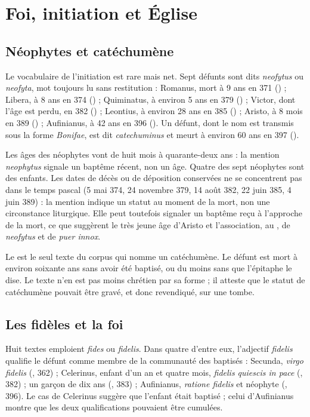 \chapter{Foi, initiation et Église}\label{ch:foi_eglise}

\section{Néophytes et catéchumène}

Le vocabulaire de l’initiation est rare mais net. Sept défunts sont dits \emph{neofytus} ou \emph{neofyta}, mot toujours lu sans restitution : Romanus, mort à 9 ans en 371 () ; Libera, à 8 ans en 374 () ; Quiminatus, à environ 5 ans en 379 () ; Victor, dont l’âge est perdu, en 382 () ; Leontius, à environ 28 ans en 385 () ; Aristo, à 8 mois en 389 () ; Aufinianus, à 42 ans en 396 (). Un défunt, dont le nom est transmis sous la forme \emph{Bonifae}, est dit \emph{catechuminus} et meurt à environ 60 ans en 397 ().

Les âges des néophytes vont de huit mois à quarante-deux ans : la mention \emph{neophytus} signale un baptême récent, non un âge. Quatre des sept néophytes sont des enfants. Les dates de décès ou de déposition conservées ne se concentrent pas dans le temps pascal (5 mai 374, 24 novembre 379, 14 août 382, 22 juin 385, 4 juin 389) : la mention indique un statut au moment de la mort, non une circonstance liturgique. Elle peut toutefois signaler un baptême reçu à l’approche de la mort, ce que suggèrent le très jeune âge d’Aristo et l’association, au , de \emph{neofytus} et de \emph{puer innox}.

Le  est le seul texte du corpus qui nomme un catéchumène. Le défunt est mort à environ soixante ans sans avoir été baptisé, ou du moins sans que l’épitaphe le dise. Le texte n’en est pas moins chrétien par sa forme ; il atteste que le statut de catéchumène pouvait être gravé, et donc revendiqué, sur une tombe.

\section{Les fidèles et la foi}

Huit textes emploient \emph{fides} ou \emph{fidelis}. Dans quatre d’entre eux, l’adjectif \emph{fidelis} qualifie le défunt comme membre de la communauté des baptisés : Secunda, \emph{virgo fidelis} (, 362) ; Celerinus, enfant d’un an et quatre mois, \emph{fidelis quiescis in pace} (, 382) ; un garçon de dix ans (, 383) ; Aufinianus, \emph{ratione fidelis} et néophyte (, 396). Le cas de Celerinus suggère que l’enfant était baptisé ; celui d’Aufinianus montre que les deux qualifications pouvaient être cumulées.

